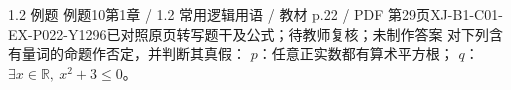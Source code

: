 \par\noindent\begin{minipage}{\linewidth}
\begin{bankitem}{1.2 例题 例题10}{第1章 / 1.2 常用逻辑用语 / 教材 p.22 / PDF 第29页}{XJ-B1-C01-EX-P022-Y1296}{已对照原页转写题干及公式；待教师复核；未制作答案}
对下列含有量词的命题作否定，并判断其真假：
$p$：任意正实数都有算术平方根；
$q$：$\exists x\in\mathbb R,\ x^2+3\le0$。
\end{bankitem}
\end{minipage}\par\medskip
